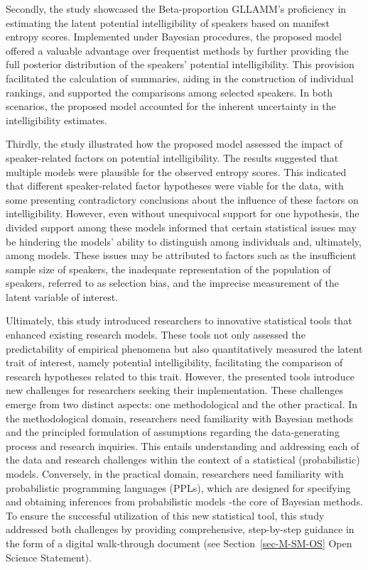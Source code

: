 \documentclass[
  authoryear,
  preprint,
  1p]{elsarticle}
\begin{document}
Secondly, the study showcased the Beta-proportion GLLAMM's proficiency
in estimating the latent potential intelligibility of speakers based on
manifest entropy scores. Implemented under Bayesian procedures, the
proposed model offered a valuable advantage over frequentist methods by
further providing the full posterior distribution of the speakers'
potential intelligibility. This provision facilitated the calculation of
summaries, aiding in the construction of individual rankings, and
supported the comparisons among selected speakers. In both scenarios,
the proposed model accounted for the inherent uncertainty in the
intelligibility estimates.

Thirdly, the study illustrated how the proposed model assessed the
impact of speaker-related factors on potential intelligibility. The
results suggested that multiple models were plausible for the observed
entropy scores. This indicated that different speaker-related factor
hypotheses were viable for the data, with some presenting contradictory
conclusions about the influence of these factors on intelligibility.
However, even without unequivocal support for one hypothesis, the
divided support among these models informed that certain statistical
issues may be hindering the models' ability to distinguish among
individuals and, ultimately, among models. These issues may be
attributed to factors such as the insufficient sample size of speakers,
the inadequate representation of the population of speakers, referred to
as selection bias, and the imprecise measurement of the latent variable
of interest.

Ultimately, this study introduced researchers to innovative statistical
tools that enhanced existing research models. These tools not only
assessed the predictability of empirical phenomena but also
quantitatively measured the latent trait of interest, namely potential
intelligibility, facilitating the comparison of research hypotheses
related to this trait. However, the presented tools introduce new
challenges for researchers seeking their implementation. These
challenges emerge from two distinct aspects: one methodological and the
other practical. In the methodological domain, researchers need
familiarity with Bayesian methods and the principled formulation of
assumptions regarding the data-generating process and research
inquiries. This entails understanding and addressing each of the data
and research challenges within the context of a statistical
(probabilistic) models. Conversely, in the practical domain, researchers
need familiarity with probabilistic programming languages (PPLs), which
are designed for specifying and obtaining inferences from probabilistic
models -the core of Bayesian methods. To ensure the successful
utilization of this new statistical tool, this study addressed both
challenges by providing comprehensive, step-by-step guidance in the form
of a digital walk-through document (see Section~\ref{sec-M-SM-OS} Open
Science Statement).
\end{document}
